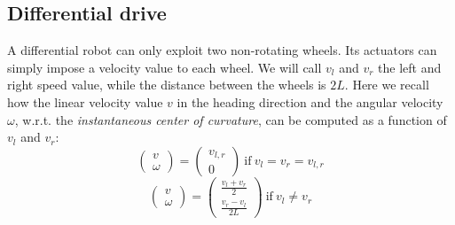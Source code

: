 	\subsection{Differential drive}
		\label{app.differential_drive}
		
		A differential robot can only exploit two non-rotating wheels. 
		Its actuators can simply impose a velocity value to each wheel. 
		We will call $v_l$ and $v_r$ the left and right speed value, while the distance between the wheels is $2L$.
		Here we recall how the linear velocity value $v$ in the heading direction and the angular velocity $\omega$, w.r.t. the \emph{instantaneous center of curvature}, can be computed as a function of $v_l$ and $v_r$:
		\begin{equation}
			\left(\begin{array}{c}
				v \\ \omega
			\end{array}\right)
			=
			\left(\begin{array}{c}
				v_{l,r} \\ 0
			\end{array}\right)
			\ \mathrm{if} \ v_l = v_r = v_{l,r}
		\end{equation}
		\begin{equation}
			\left(\begin{array}{c}
				v \\ \omega
			\end{array}\right)
			=
			\left(\begin{array}{c}
				\frac{v_l + v_r}{2} \\ 
				\frac{v_r - v_l}{2L}
			\end{array}\right)
			\ \mathrm{if} \ v_l \neq v_r
		\end{equation}